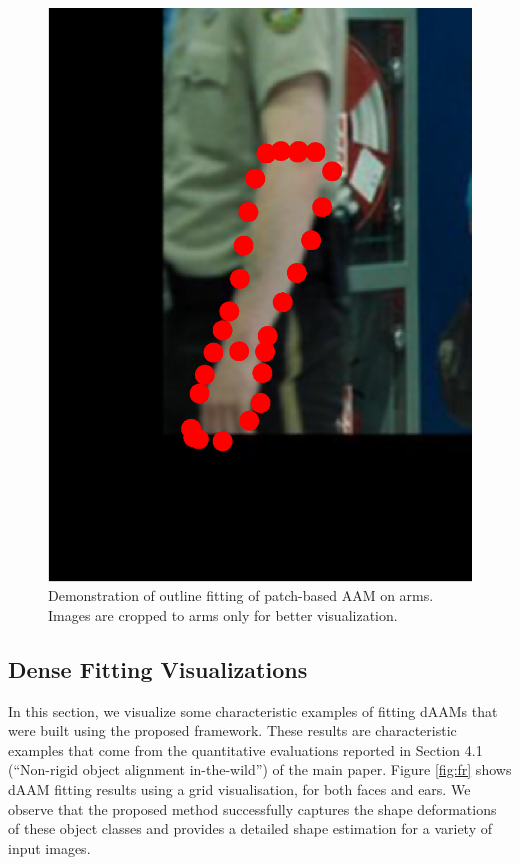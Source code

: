 \begin{figure}[!t]
    \includegraphics[height=\ofh]{resources/Annotation_Correction/Suplementory_Meterial/ExFit/0044.eps}
    \caption{Demonstration of outline fitting of patch-based AAM on arms. Images are cropped to arms only for better visualization.}
    \label{fig:paam_fittingresults}
\end{figure}


\subsection{Dense Fitting Visualizations}
\label{sec:daam_fittingresults}


In this section, we visualize some characteristic examples of fitting
dAAMs that were built using the proposed framework. These results are characteristic examples that come from the quantitative evaluations reported in Section 4.1 (``Non-rigid object alignment in-the-wild'') of the main paper. Figure \ref{fig:fr} shows dAAM fitting results using a grid visualisation, for both faces and ears. We observe that the proposed method successfully captures the shape deformations of these object classes and provides a detailed shape estimation for a variety of input images.


